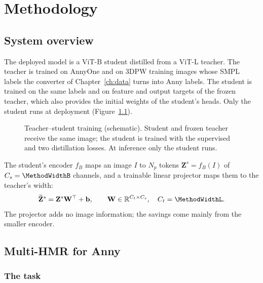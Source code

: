 \chapter{Methodology}
\label{ch:method}

\section{System overview}
\label{sec:method-overview}

The deployed model is a ViT-B student distilled from a ViT-L teacher. The teacher is trained on AnnyOne and on 3DPW
training images whose SMPL labels the converter of Chapter~\ref{ch:data} turns into Anny labels. The student is trained
on the same labels and on feature and output targets of the frozen teacher, which also provides the initial weights of
the student's heads. Only the student runs at deployment (Figure~\ref{fig:distillation}).

\begin{figure}[!htb]
\centering

\caption[Teacher--student training and the deployed model]{Teacher--student training (schematic). Student and frozen teacher receive the same
image; the student is trained with the supervised and two distillation losses. At inference only the student runs.}
\label{fig:distillation}
\end{figure}

The student's encoder $f_B$ maps an image $I$ to $N_p$ tokens $\mathbf Z^s=f_B(I)$ of $C_s=\MethodWidthB$
channels, and a trainable linear projector maps them to the teacher's width:
\begin{equation}
 \widetilde{\mathbf Z}^s=\mathbf Z^s\mathbf W^\top+\mathbf b,\qquad
 \mathbf W\in\mathbb R^{C_t\times C_s},\quad C_t=\MethodWidthL .
\label{eq:student-projection}
\end{equation}
The projector adds no image information; the savings come mainly from the smaller encoder.

\section{Multi-HMR for Anny}
\label{sec:method-arch}

\subsection{The task}
\label{sec:method-task}

